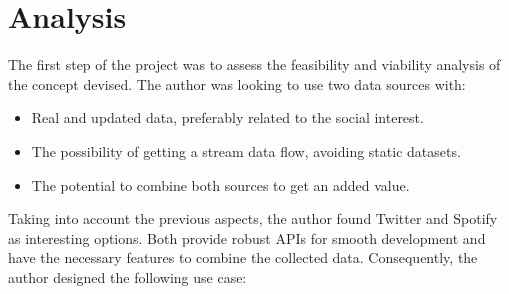 

\section{Analysis}

\nonzeroparskip The first step of the project was to assess the feasibility and viability analysis of the concept devised. The author was looking to use two data sources with:

\begin{itemize}
	\item Real and updated data, preferably related to the social interest.
	\item The possibility of getting a stream data flow, avoiding static datasets.
	\item The potential to combine both sources to get an added value.
\end{itemize}

\nonzeroparskip Taking into account the previous aspects, the author found Twitter and Spotify as interesting options. Both provide robust APIs for smooth development and have the necessary features to combine the collected data. Consequently, the author designed the following use case:


